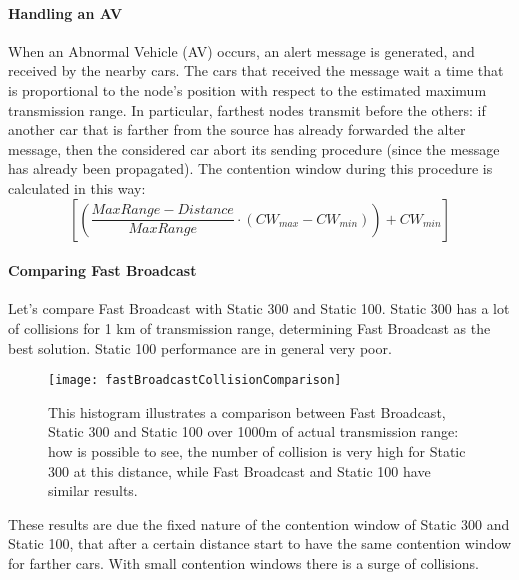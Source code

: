 \paragraph*{Handling an AV} When an Abnormal Vehicle (AV) occurs, an alert
message is generated, and received by the nearby cars. The cars that received
the message wait a time that is proportional to the node's position with
respect to the estimated maximum transmission range. In particular, farthest
nodes transmit before the others: if another car that is farther from the source
has already forwarded the alter message, then the considered car abort its
sending procedure (since the message has already been propagated). The
contention window during this procedure is calculated in this way:
\begin{equation}
\left [ \left ( \frac{MaxRange - Distance}{MaxRange} \cdot (CW_{max} - CW_{min}) \right ) + CW_{min} \right ]
\end{equation}

\paragraph*{Comparing Fast Broadcast}
Let's compare Fast Broadcast with Static 300 and Static 100. Static 300 has a
lot of collisions for 1 km of transmission range, determining Fast Broadcast as
the best solution. Static 100 performance are in general very poor.

\begin{figure}[t]
  \centering
  \texttt{[image: fastBroadcastCollisionComparison]}
  \caption[Fast broadcast comparison]{This histogram illustrates a comparison
    between Fast Broadcast, Static 300 and Static 100 over 1000m of actual
    transmission range: how is possible to see, the number of collision is very
    high for Static 300 at this distance, while Fast Broadcast and Static 100
    have similar results.}
  \label{fig:802.11ws:fastBroadCastComparison}
\end{figure}

These results are due the fixed nature of the contention window of Static 300
and Static 100, that after a certain distance start to have the same contention
window for farther cars. With small contention windows there is a surge of
collisions.

